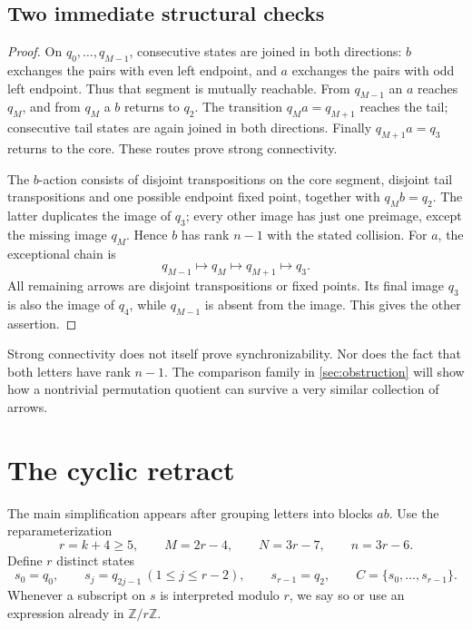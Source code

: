 \documentclass[11pt,a4paper]{article}
\numberwithin{equation}{section}
\newtheorem{proposition}[theorem]{Proposition}
\theoremstyle{definition}
\theoremstyle{remark}
\newcommand{\Ak}{\mathcal A_k}
\newcommand{\Zr}{\mathbb Z/r\mathbb Z}
\begin{document}
\subsection{Two immediate structural checks}

\begin{proof}
On $q_0,\ldots,q_{M-1}$, consecutive states are joined in both directions:
$b$ exchanges the pairs with even left endpoint, and $a$ exchanges the pairs
with odd left endpoint. Thus that segment is mutually reachable. From
$q_{M-1}$ an $a$ reaches $q_M$, and from $q_M$ a $b$ returns to $q_2$.
The transition $q_Ma=q_{M+1}$ reaches the tail; consecutive tail states
are again joined in both directions. Finally $q_{M+1}a=q_3$ returns to the
core. These routes prove strong connectivity.

The $b$-action consists of disjoint transpositions on the core segment,
disjoint tail transpositions and one possible endpoint fixed point, together
with $q_Mb=q_2$. The latter duplicates the image of $q_3$; every other image
has just one preimage, except the missing image $q_M$. Hence $b$ has rank
$n-1$ with the stated collision. For $a$, the exceptional chain is
\[
 q_{M-1}\longmapsto q_M\longmapsto q_{M+1}\longmapsto q_3.
\]
All remaining arrows are disjoint transpositions or fixed points. Its final
image $q_3$ is also the image of $q_4$, while $q_{M-1}$ is absent from the
image. This gives the other assertion.
\end{proof}

Strong connectivity does not itself prove synchronizability. Nor does the
fact that both letters have rank $n-1$. The comparison family in
\cref{sec:obstruction} will show how a nontrivial permutation quotient can
survive a very similar collection of arrows.

\section{The cyclic retract}
\label{sec:retract}

The main simplification appears after grouping letters into blocks $ab$.
Use the reparameterization
\begin{equation}\label{eq:rparameters}
 r=k+4\geq5,\qquad M=2r-4,\qquad N=3r-7,\qquad n=3r-6.
\end{equation}
Define $r$ distinct states
\begin{equation}\label{eq:cycle}
 s_0=q_0,\qquad s_j=q_{2j-1}\ (1\leq j\leq r-2),\qquad
 s_{r-1}=q_2,
 \qquad C=\{s_0,\ldots,s_{r-1}\}.
\end{equation}
Whenever a subscript on $s$ is interpreted modulo $r$, we say so or use an
expression already in $\Zr$.
\end{document}
